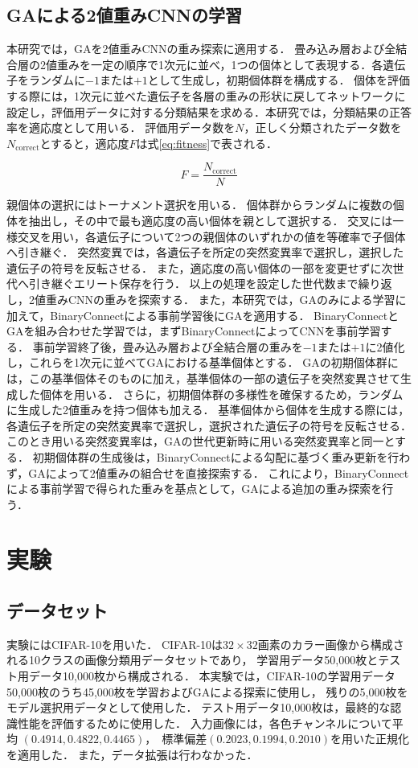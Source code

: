 \documentclass[a4paper]{jarticle}
\begin{document}
\subsection{GAによる2値重みCNNの学習}
本研究では，GAを2値重みCNNの重み探索に適用する．
畳み込み層および全結合層の2値重みを一定の順序で1次元に並べ，1つの個体として表現する．各遺伝子をランダムに$-1$または$+1$として生成し，初期個体群を構成する．
個体を評価する際には，1次元に並べた遺伝子を各層の重みの形状に戻してネットワークに設定し，評価用データに対する分類結果を求める．本研究では，分類結果の正答率を適応度として用いる．
評価用データ数を$N$，正しく分類されたデータ数を$N_{\mathrm{correct}}$とすると，適応度$F$は式\eqref{eq:fitness}で表される．

\begin{equation}
  F = \frac{N_{\mathrm{correct}}}{N}
  \label{eq:fitness}
\end{equation}

親個体の選択にはトーナメント選択を用いる．
個体群からランダムに複数の個体を抽出し，その中で最も適応度の高い個体を親として選択する．
交叉には一様交叉を用い，各遺伝子について2つの親個体のいずれかの値を等確率で子個体へ引き継ぐ．
突然変異では，各遺伝子を所定の突然変異率で選択し，選択した遺伝子の符号を反転させる．
また，適応度の高い個体の一部を変更せずに次世代へ引き継ぐエリート保存を行う．
以上の処理を設定した世代数まで繰り返し，2値重みCNNの重みを探索する．
また，本研究では，GAのみによる学習に加えて，BinaryConnectによる事前学習後にGAを適用する．
BinaryConnectとGAを組み合わせた学習では，まずBinaryConnectによってCNNを事前学習する．
事前学習終了後，畳み込み層および全結合層の重みを$-1$または$+1$に2値化し，これらを1次元に並べてGAにおける基準個体とする．
GAの初期個体群には，この基準個体そのものに加え，基準個体の一部の遺伝子を突然変異させて生成した個体を用いる．
さらに，初期個体群の多様性を確保するため，ランダムに生成した2値重みを持つ個体も加える．
基準個体から個体を生成する際には，各遺伝子を所定の突然変異率で選択し，選択された遺伝子の符号を反転させる．
このとき用いる突然変異率は，GAの世代更新時に用いる突然変異率と同一とする．
初期個体群の生成後は，BinaryConnectによる勾配に基づく重み更新を行わず，GAによって2値重みの組合せを直接探索する．
これにより，BinaryConnectによる事前学習で得られた重みを基点として，GAによる追加の重み探索を行う．


\section{実験}

\subsection{データセット}
実験にはCIFAR-10を用いた．
CIFAR-10は$32 \times 32$画素のカラー画像から構成される10クラスの画像分類用データセットであり，
学習用データ50,000枚とテスト用データ10,000枚から構成される．
本実験では，CIFAR-10の学習用データ50,000枚のうち45,000枚を学習およびGAによる探索に使用し，
残りの5,000枚をモデル選択用データとして使用した．
テスト用データ10,000枚は，最終的な認識性能を評価するために使用した．
入力画像には，各色チャンネルについて平均
$(0.4914, 0.4822, 0.4465)$，　標準偏差$(0.2023, 0.1994, 0.2010)$を用いた正規化を適用した．
また，データ拡張は行わなかった．
\end{document}
